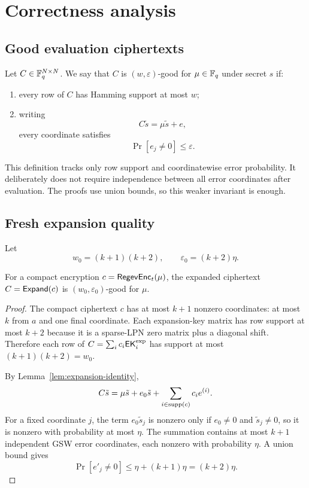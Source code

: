 \section{Correctness analysis}

\subsection{Good evaluation ciphertexts}

\begin{definition}
Let $C\in\mathbb{F}_q^{N\times N}$.  We say that $C$ is $(w,\varepsilon)$-good for $\mu\in\mathbb{F}_q$ under secret $s$ if:
\begin{enumerate}
    \item every row of $C$ has Hamming support at most $w$;
    \item writing
    \[
        C\tilde{s}=\mu\tilde{s}+e,
    \]
    every coordinate satisfies
    \[
        \Pr[e_j\ne 0]\le \varepsilon.
    \]
\end{enumerate}
\end{definition}

This definition tracks only row support and coordinatewise error probability.  It deliberately does not require independence between all error coordinates after evaluation.  The proofs use union bounds, so this weaker invariant is enough.

\subsection{Fresh expansion quality}

Let
\[
    w_0=(k+1)(k+2),
    \qquad
    \varepsilon_0=(k+2)\eta.
\]

\begin{lemma}
\label{lem:fresh-quality}
For a compact encryption $c=\mathsf{Regev}\mathsf{Enc}_t(\mu)$, the expanded ciphertext $C=\mathsf{Expand}(c)$ is $(w_0,\varepsilon_0)$-good for $\mu$.
\end{lemma}

\begin{proof}
The compact ciphertext $c$ has at most $k+1$ nonzero coordinates: at most $k$ from $a$ and one final coordinate.  Each expansion-key matrix has row support at most $k+2$ because it is a sparse-LPN zero matrix plus a diagonal shift.  Therefore each row of $C=\sum_i c_i\mathsf{EK}^{\rm exp}_i$ has support at most $(k+1)(k+2)=w_0$.

By Lemma~\ref{lem:expansion-identity},
\[
    C\tilde{s}=\mu\tilde{s}+e_0\tilde{s}+\sum_{i\in\operatorname{supp}(c)}c_ie^{(i)}.
\]
For a fixed coordinate $j$, the term $e_0\tilde{s}_j$ is nonzero only if $e_0\ne 0$ and $\tilde{s}_j\ne0$, so it is nonzero with probability at most $\eta$.  The summation contains at most $k+1$ independent GSW error coordinates, each nonzero with probability $\eta$.  A union bound gives
\[
    \Pr[e'_j\ne0]\le \eta+(k+1)\eta=(k+2)\eta.
\]
\end{proof}

